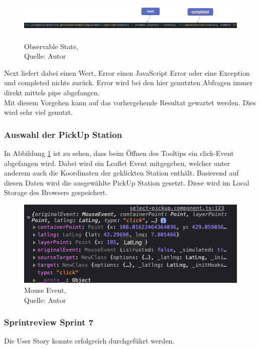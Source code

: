  \begin{figure}[H]
	\centering
	\includegraphics[width=1\textwidth]{images/observable.PNG}
	\caption[Observable States]{Observable State,\\ Quelle: Autor}
	\label{img: observableState}
\end{figure} 

Next liefert dabei einen Wert, Error einen JavaScript Error oder eine Exception und completed nichts zurück. 
Error wird bei den hier genutzten Abfragen immer direkt mittels pipe abgefangen. \\
Mit diesem Vorgehen kann auf das vorhergehende Resultat gewartet werden. Dies wird sehr viel genutzt. 

\subsubsection{Auswahl der PickUp Station}
In Abbildung \ref{img: observableState} ist zu sehen, dass beim Öffnen des Tooltips ein click-Event abgefangen wird. Dabei wird ein Leaflet Event mitgegeben, welcher unter anderem auch die Koordinaten der geklickten Station enthält. Basierend auf diesen Daten wird die ausgewählte PickUp Station gesetzt. Diese wird im Local Storage des Browsers gespeichert. 
 \begin{figure}[H]
	\centering
	\includegraphics[width=1\textwidth]{images/mouseEvent.PNG}
	\caption[Mouse Event]{Mouse Event,\\ Quelle: Autor}
	\label{img: MouseEvent}
\end{figure} 
\subsubsection{Sprintreview Sprint 7}
Die User Story konnte erfolgreich durchgeführt werden. 

